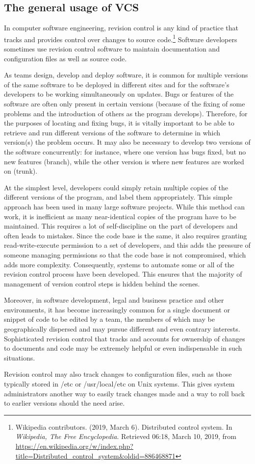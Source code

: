 \documentclass[a4paper]{report}
\begin{document}
\subsection{The general usage of VCS}
\par
In computer software engineering, revision control is any kind of practice that tracks and provides control over changes to source code.\footnote{Wikipedia contributors. (2019, March 6). Distributed control system. In \emph{Wikipedia, The Free Encyclopedia}. Retrieved 06:18, March 10, 2019, from \url{https://en.wikipedia.org/w/index.php?title=Distributed_control_system&oldid=886468871}} Software developers sometimes use revision control software to maintain documentation and configuration files as well as source code.
\par
As teams design, develop and deploy software, it is common for multiple versions of the same software to be deployed in different sites and for the software's developers to be working simultaneously on updates. Bugs or features of the software are often only present in certain versions (because of the fixing of some problems and the introduction of others as the program develops). Therefore, for the purposes of locating and fixing bugs, it is vitally important to be able to retrieve and run different versions of the software to determine in which version(s) the problem occurs. It may also be necessary to develop two versions of the software concurrently: for instance, where one version has bugs fixed, but no new features (branch), while the other version is where new features are worked on (trunk).
\par
At the simplest level, developers could simply retain multiple copies of the different versions of the program, and label them appropriately. This simple approach has been used in many large software projects. While this method can work, it is inefficient as many near-identical copies of the program have to be maintained. This requires a lot of self-discipline on the part of developers and often leads to mistakes. Since the code base is the same, it also requires granting read-write-execute permission to a set of developers, and this adds the pressure of someone managing permissions so that the code base is not compromised, which adds more complexity. Consequently, systems to automate some or all of the revision control process have been developed. This ensures that the majority of management of version control steps is hidden behind the scenes.
\par
Moreover, in software development, legal and business practice and other environments, it has become increasingly common for a single document or snippet of code to be edited by a team, the members of which may be geographically dispersed and may pursue different and even contrary interests. Sophisticated revision control that tracks and accounts for ownership of changes to documents and code may be extremely helpful or even indispensable in such situations.
\par
Revision control may also track changes to configuration files, such as those typically stored in /etc or /usr/local/etc on Unix systems. This gives system administrators another way to easily track changes made and a way to roll back to earlier versions should the need arise.
\end{document}

